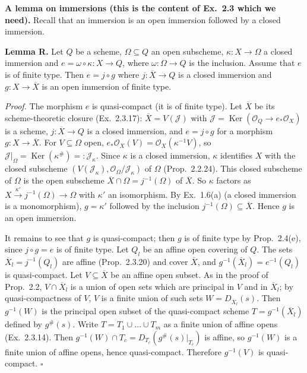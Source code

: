 \documentclass[11pt]{article}
\begin{document}
\textbf{A lemma on immersions (this is the content of Ex.~2.3 which we need).} Recall that an immersion is an open immersion followed by a closed immersion.

\textbf{Lemma R.} Let $Q$ be a scheme, $\Omega\subseteq Q$ an open subscheme, $\kappa:X\to\Omega$ a closed immersion and $e=\omega\circ\kappa:X\to Q$, where $\omega:\Omega\to Q$ is the inclusion. Assume that $e$ is of finite type. Then $e=j\circ g$ where $j:\overline X\to Q$ is a closed immersion and $g:X\to\overline X$ is an open immersion of finite type.

\emph{Proof.} The morphism $e$ is quasi-compact (it is of finite type). Let $\overline{X}$ be its scheme-theoretic closure (Ex.~2.3.17): $\overline X=V(\mathcal{J})$ with $\mathcal{J}=\operatorname{Ker}(\mathcal{O}_Q\to e_*\mathcal{O}_X)$ is a scheme, $j:\overline X\to Q$ is a closed immersion, and $e=j\circ g$ for a morphism $g:X\to\overline X$. For $V\subseteq\Omega$ open, $e_*\mathcal{O}_X(V)=\mathcal{O}_X(\kappa^{-1}V)$, so $\mathcal{J}|_\Omega=\operatorname{Ker}(\kappa^\#)=:\mathcal{J}_\kappa$. Since $\kappa$ is a closed immersion, $\kappa$ identifies $X$ with the closed subscheme $(V(\mathcal{J}_\kappa),\mathcal{O}_\Omega/\mathcal{J}_\kappa)$ of $\Omega$ (Prop.~2.2.24). This closed subscheme of $\Omega$ is the open subscheme $\overline X\cap\Omega=j^{-1}(\Omega)$ of $\overline X$. So $\kappa$ factors as $X\xrightarrow{\kappa'}j^{-1}(\Omega)\to\Omega$ with $\kappa'$ an isomorphism. By Ex.~1.6(a) (a closed immersion is a monomorphism), $g=\kappa'$ followed by the inclusion $j^{-1}(\Omega)\subseteq\overline X$. Hence $g$ is an open immersion.

It remains to see that $g$ is quasi-compact; then $g$ is of finite type by Prop.~2.4(e), since $j\circ g=e$ is of finite type. Let $Q_l$ be an affine open covering of $Q$. The sets $\overline X_l=j^{-1}(Q_l)$ are affine (Prop.~2.3.20) and cover $\overline X$, and $g^{-1}(\overline X_l)=e^{-1}(Q_l)$ is quasi-compact. Let $V\subseteq\overline X$ be an affine open subset. As in the proof of Prop.~2.2, $V\cap\overline X_l$ is a union of open sets which are principal in $V$ and in $\overline X_l$; by quasi-compactness of $V$, $V$ is a finite union of such sets $W=D_{\overline X_l}(s)$. Then $g^{-1}(W)$ is the principal open subset of the quasi-compact scheme $T=g^{-1}(\overline X_l)$ defined by $g^\#(s)$. Write $T=T_1\cup\dots\cup T_m$ as a finite union of affine opens (Ex.~2.3.14). Then $g^{-1}(W)\cap T_c=D_{T_c}(g^\#(s)|_{T_c})$ is affine, so $g^{-1}(W)$ is a finite union of affine opens, hence quasi-compact. Therefore $g^{-1}(V)$ is quasi-compact. $\square$
\end{document}
